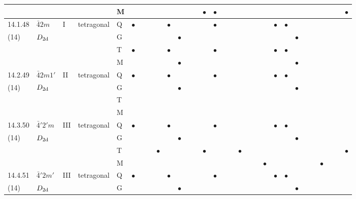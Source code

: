 \documentclass[fleqn,9pt,landscape]{jsarticle}
\begin{document}
\begin{longtable}{lllll|l|lll|ll|lll|l|lll|lll|l|ll|lll|lll}
 &  &  &  & M &  &  &  &  &  &  &  &  & $\bullet$ & $\bullet$ &  &  &  &  &  &  &  &  &  &  &  &  &  &  & $\bullet$ \\ \hline
14.1.48 & \texttt{$\bar{4}2m$} & I & tetragonal & Q & $\bullet$ &  &  &  & $\bullet$ &  &  &  &  & $\bullet$ &  &  &  &  &  &  & $\bullet$ & $\bullet$ &  &  &  &  &  &  &  \\
(14) & $D_{\rm 2d}$ &  &  & G &  &  &  &  &  & $\bullet$ &  &  &  &  &  &  &  &  &  &  &  &  & $\bullet$ &  &  &  &  &  &  \\
 &  &  &  & T & $\bullet$ &  &  &  & $\bullet$ &  &  &  &  & $\bullet$ &  &  &  &  &  &  & $\bullet$ & $\bullet$ &  &  &  &  &  &  &  \\
 &  &  &  & M &  &  &  &  &  & $\bullet$ &  &  &  &  &  &  &  &  &  &  &  &  & $\bullet$ &  &  &  &  &  &  \\ \hline
14.2.49 & \texttt{$\bar{4}2m1'$} & II & tetragonal & Q & $\bullet$ &  &  &  & $\bullet$ &  &  &  &  & $\bullet$ &  &  &  &  &  &  & $\bullet$ & $\bullet$ &  &  &  &  &  &  &  \\
(14) & $D_{\rm 2d}$ &  &  & G &  &  &  &  &  & $\bullet$ &  &  &  &  &  &  &  &  &  &  &  &  & $\bullet$ &  &  &  &  &  &  \\
 &  &  &  & T &  &  &  &  &  &  &  &  &  &  &  &  &  &  &  &  &  &  &  &  &  &  &  &  &  \\
 &  &  &  & M &  &  &  &  &  &  &  &  &  &  &  &  &  &  &  &  &  &  &  &  &  &  &  &  &  \\ \hline
14.3.50 & \texttt{$\bar{4}'2'm$} & III & tetragonal & Q & $\bullet$ &  &  &  & $\bullet$ &  &  &  &  & $\bullet$ &  &  &  &  &  &  & $\bullet$ & $\bullet$ &  &  &  &  &  &  &  \\
(14) & $D_{\rm 2d}$ &  &  & G &  &  &  &  &  & $\bullet$ &  &  &  &  &  &  &  &  &  &  &  &  & $\bullet$ &  &  &  &  &  &  \\
 &  &  &  & T &  &  &  & $\bullet$ &  &  &  &  & $\bullet$ &  &  &  & $\bullet$ &  &  &  &  &  &  &  &  &  &  &  & $\bullet$ \\
 &  &  &  & M &  &  &  &  &  &  &  &  &  &  &  &  &  &  &  & $\bullet$ &  &  &  &  &  & $\bullet$ &  &  &  \\ \hline
14.4.51 & \texttt{$\bar{4}'2m'$} & III & tetragonal & Q & $\bullet$ &  &  &  & $\bullet$ &  &  &  &  & $\bullet$ &  &  &  &  &  &  & $\bullet$ & $\bullet$ &  &  &  &  &  &  &  \\
(14) & $D_{\rm 2d}$ &  &  & G &  &  &  &  &  & $\bullet$ &  &  &  &  &  &  &  &  &  &  &  &  & $\bullet$ &  &  &  &  &  &  \\

\end{longtable}
\end{document}
